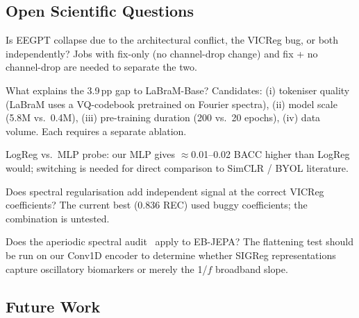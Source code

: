 \documentclass[11pt,a4paper]{article}
\begin{document}
\subsection{Open Scientific Questions}
\begin{description}[noitemsep]
  \item[D1] Is EEGPT collapse due to the architectural conflict, the VICReg bug,
    or both independently?  Jobs with fix-only (no channel-drop change) and
    fix + no channel-drop are needed to separate the two.
  \item[D2] What explains the 3.9\,pp gap to LaBraM-Base?
    Candidates: (i) tokeniser quality (LaBraM uses a VQ-codebook pretrained on
    Fourier spectra), (ii) model scale (5.8M vs.\ 0.4M), (iii) pre-training
    duration (200 vs.\ 20 epochs), (iv) data volume.  Each requires a separate
    ablation.
  \item[D3] LogReg vs.\ MLP probe: our MLP gives $\approx$0.01--0.02 BACC higher
    than LogReg would; switching is needed for direct comparison to SimCLR / BYOL
    literature.
  \item[D4] Does spectral regularisation add independent signal at the correct
    VICReg coefficients?  The current best (0.836 REC) used buggy coefficients;
    the combination is untested.
  \item[D5] Does the aperiodic spectral audit~\cite{spectral_audit} apply to
    EB-JEPA?  The flattening test should be run on our Conv1D encoder to determine
    whether SIGReg representations capture oscillatory biomarkers or merely the
    1/$f$ broadband slope.
\end{description}

\subsection{Future Work}
\end{document}
